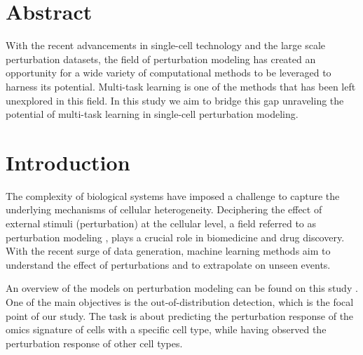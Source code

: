 \documentclass[12pt, a4paper]{article}
\begin{document}



{
\renewcommand*\contentsname{Περιεχόμενα}
\hypersetup{linkcolor=black}
\tableofcontents
}

\thispagestyle{empty}

\clearpage

\section{Abstract}

With the recent advancements in single-cell technology and the large scale perturbation datasets, the field of perturbation modeling  has created an opportunity for a wide variety of computational methods to be leveraged to harness its potential. Multi-task learning is one of the methods that has been left unexplored in this field. In this study we aim to bridge this gap unraveling the potential of multi-task learning in single-cell perturbation modeling.


\section{Introduction}    

The complexity of biological systems have imposed a challenge to capture the underlying mechanisms of cellular heterogeneity. Deciphering the effect of external stimuli (perturbation) at the cellular level, a field referred to as perturbation modeling \cite{jiMachineLearningPerturbational2021}, 
plays a crucial role
in biomedicine and drug discovery. With the recent surge of data 
generation, machine learning methods aim to understand the effect of perturbations and to extrapolate on unseen events.

An overview of the models on perturbation modeling can be found on this study \cite{gavriilidisMinireviewPerturbationModelling2024}. One of the main objectives is the out-of-distribution detection, which is the focal point of our study. The task is about predicting the perturbation response of the omics signature of cells with a specific cell type, while having observed the perturbation response of other cell types.
\end{document}
